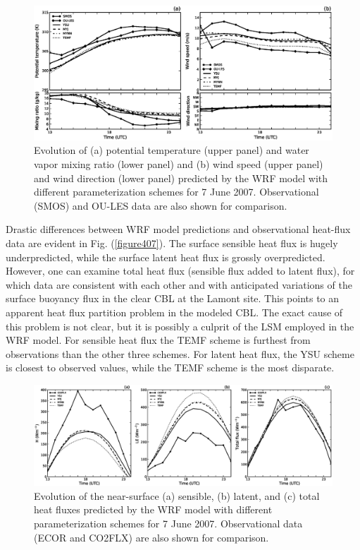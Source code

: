 \begin{figure}[ht!]
\begin{center}
\includegraphics[width=\textwidth]{figures/chapter4/meteogram_phys_20070607}
\end{center}
\caption{Evolution of (a) potential temperature (upper panel) and water vapor mixing ratio (lower panel) and (b) wind speed (upper panel) and wind direction (lower panel) predicted by the WRF model with different parameterization schemes for 7 June 2007. Observational (SMOS) and OU-LES data are also shown for comparison.}
\label{figure406}
\end{figure}


Drastic differences between WRF model predictions and observational heat-flux data are evident in Fig. (\autoref{figure407}). The surface sensible heat flux is hugely underpredicted, while the surface latent heat flux is grossly overpredicted. However, one can examine total heat flux (sensible flux added to latent flux), for which data are consistent with each other and with anticipated variations of the surface buoyancy flux in the clear CBL at the Lamont site. This points to an apparent heat flux partition problem in the modeled CBL. The exact cause of this problem is not clear, but it is possibly a culprit of the LSM employed in the WRF model. For sensible heat flux the TEMF scheme is furthest from observations than the other three schemes. For latent heat flux, the YSU scheme is closest to observed values, while the TEMF scheme is the most disparate.


\begin{figure}[ht!]
\begin{center}
\includegraphics[width=\textwidth]{figures/chapter4/shf_lhf_phys_20070607}
\end{center}
\caption{Evolution of the near-surface (a) sensible, (b) latent, and (c) total heat fluxes predicted by the WRF model with different parameterization schemes for 7 June 2007. Observational data (ECOR and CO2FLX) are also shown for comparison.}
\label{figure407}
\end{figure}


